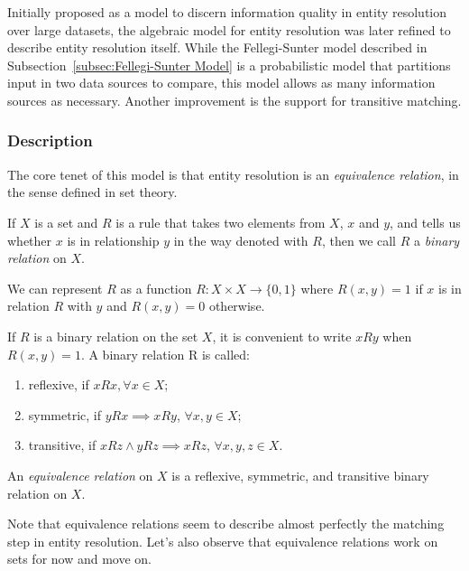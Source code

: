
Initially proposed as a model to discern information quality in entity
resolution over large datasets\cite{tal2007algebraic}, the algebraic model
for entity resolution was later refined to describe entity resolution
itself\cite{Tal11}.
While the Fellegi-Sunter model described in Subsection~\ref{subsec:Fellegi-Sunter Model} is a
probabilistic model that partitions input in two data sources to compare,
this model allows as many information sources as necessary.
Another improvement is the support for transitive matching.

\subsubsection{Description}\label{subsubsec:Algebraic Model Description}

The core tenet of this model is that entity resolution is an \textit{
equivalence relation}, in the sense defined in set theory.

\begin{defn} If $X$ is a set and $R$ is a rule that takes two elements from
$X$, $x$ and $y$, and tells us whether $x$ is in relationship $y$ in the way
denoted with $R$, then we call $R$ a \textit{binary relation} on
$X$\cite{hoffman1971linear}.
\end{defn}

We can represent $R$ as a function $R:X \times X \rightarrow \{0,1\}$ where
$R(x,y)=1$ if $x$ is in relation $R$ with $y$ and $R(x,y)=0$ otherwise.

\begin{defn}If $R$ is a binary relation on the set $X$, it is convenient to
write $xRy$ when $R(x, y) = 1$.
A binary relation R is called:

\begin{enumerate}
    \item reflexive, if $xRx, \forall x \in X$;
    \item symmetric, if $yRx \implies xRy$, $\forall x,y \in X$;
    \item transitive, if $xRz \land yRz \implies xRz$, $\forall x,y,z \in X$.
\end{enumerate}

An \textit{equivalence relation} on $X$ is a reflexive, symmetric, and
transitive binary relation on $X$\cite{hoffman1971linear}.
\end{defn}

Note that equivalence relations seem to describe almost perfectly the
matching step in entity resolution.
Let's also observe that equivalence relations work on sets for now and move
on.

